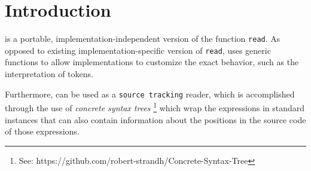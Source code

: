 \chapter{Introduction}

\sysname{} is a portable, implementation-independent version of the
\commonlisp{} function \texttt{read}.  As opposed to existing
implementation-specific version of \texttt{read}, \sysname{} uses
generic functions to allow implementations to customize the exact
behavior, such as the interpretation of tokens.

Furthermore, \sysname{} can be used as a \texttt{source tracking}
reader, which is accomplished through the use of \emph{concrete syntax
  trees}%
\footnote{See: https://github.com/robert-strandh/Concrete-Syntax-Tree}
which wrap the \commonlisp{} expressions in standard instances that
can also contain information about the positions in the source code of
those expressions.
